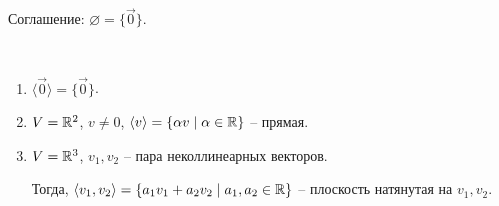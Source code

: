 Соглашение: $\varnothing = \{\overrightarrow{0}\}$.

\begin{example}~
    \begin{enumerate}
    \item
        $\langle \overrightarrow{0} \rangle = \{\overrightarrow{0}\}$.
    \item
        $V = \mathbb{R}^2$, $v \neq 0$, $\langle v \rangle = \{\alpha v \mid \alpha \in \mathbb{R}\}$ -- прямая.
    \item
        $V = \mathbb{R}^3$, $v_1, v_2$ -- пара неколлинеарных векторов.

        Тогда, $\langle v_1, v_2 \rangle = \{a_1 v_1 + a_2 v_2 \mid a_1, a_2 \in \mathbb{R}\}$ -- плоскость натянутая на $v_1, v_2$.
    \end{enumerate}
\end{example}
